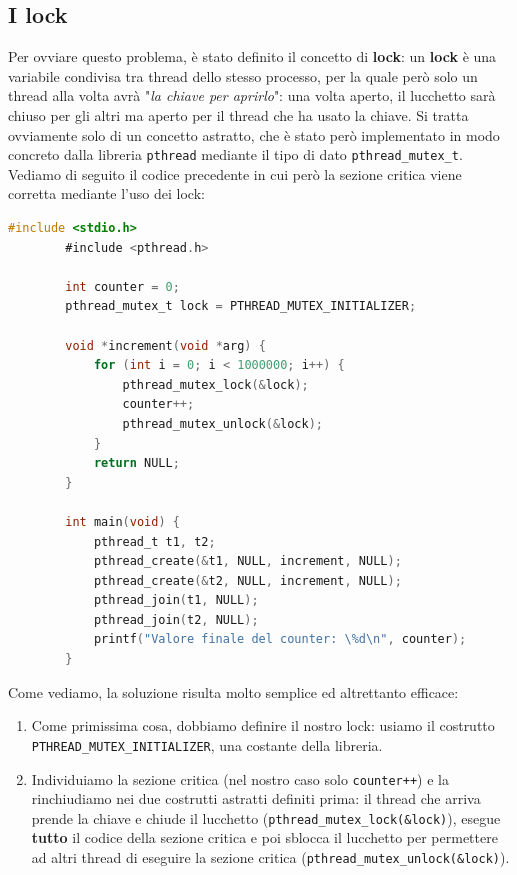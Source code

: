 \documentclass[12pt]{report}
\begin{document}
	\subsection{I lock}
	Per ovviare questo problema, è stato definito il concetto di \textbf{lock}: un \textbf{lock} è una variabile condivisa tra thread dello stesso processo, per la quale però solo un thread alla volta avrà "\textit{la chiave per aprirlo}": una volta aperto, il lucchetto sarà chiuso per gli altri ma aperto per il thread che ha usato la chiave. Si tratta ovviamente solo di un concetto astratto, che è stato però implementato in modo concreto dalla libreria \texttt{pthread} mediante il tipo di dato \texttt{pthread\_mutex\_t}.\\
	Vediamo di seguito il codice precedente in cui però la sezione critica viene corretta mediante l'uso dei lock:
	\begin{lstlisting}[language=C, style=stile-listings]
		#include <stdio.h>
		#include <pthread.h>
		
		int counter = 0;
		pthread_mutex_t lock = PTHREAD_MUTEX_INITIALIZER;
		
		void *increment(void *arg) {
			for (int i = 0; i < 1000000; i++) {
				pthread_mutex_lock(&lock);
				counter++;
				pthread_mutex_unlock(&lock);
			}
			return NULL;
		}
		
		int main(void) {
			pthread_t t1, t2;
			pthread_create(&t1, NULL, increment, NULL);
			pthread_create(&t2, NULL, increment, NULL);
			pthread_join(t1, NULL);
			pthread_join(t2, NULL);
			printf("Valore finale del counter: \%d\n", counter);
		}
	\end{lstlisting}
	Come vediamo, la soluzione risulta molto semplice ed altrettanto efficace:
	\begin{enumerate}
		\item Come primissima cosa, dobbiamo definire il nostro lock: usiamo il costrutto \texttt{PTHREAD\_MUTEX\_INITIALIZER}, una costante della libreria.
		
		\item Individuiamo la sezione critica (nel nostro caso solo \texttt{counter++}) e la rinchiudiamo nei due costrutti astratti definiti prima: il thread che arriva prende la chiave e chiude il lucchetto (\texttt{pthread\_mutex\_lock(\&lock)}), esegue \textbf{tutto} il codice della sezione critica e poi sblocca il lucchetto per permettere ad altri thread di eseguire la sezione critica (\texttt{pthread\_mutex\_unlock(\&lock)}).
	\end{enumerate}
	
\end{document}

